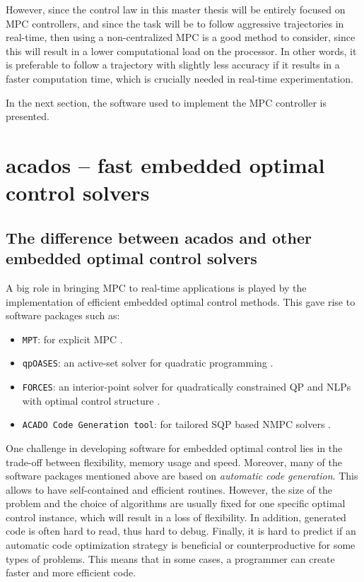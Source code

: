 \documentclass{thesisreport}
\begin{document}
However, since the control law in this master thesis will be entirely focused on MPC controllers, and since the task will be to follow aggressive trajectories in real-time, then using a non-centralized MPC is a good method to consider, since this will result in a lower computational load on the processor. In other words, it is preferable to follow a trajectory with slightly less accuracy if it results in a faster computation time, which is crucially needed in real-time experimentation.

In the next section, the software used to implement the MPC controller is presented.

 \newpage  
	 

 
 \section{acados – fast embedded optimal control solvers}
 
 \subsection{The difference between acados and other embedded optimal control solvers}
 A big role in bringing MPC to real-time applications is played by the implementation of efficient embedded optimal control methods. This gave rise to software
packages such as:
    \begin{itemize}
        \item \texttt{MPT}: for explicit MPC \cite{MPT3}.
        \item \texttt{qpOASES}: an active-set solver for quadratic programming \cite{qpOASES}.
        \item \texttt{FORCES}: an interior-point solver for quadratically constrained QP and NLPs with optimal control structure \cite{FORCES}.
        \item \texttt{ACADO Code Generation tool}: for tailored SQP based NMPC solvers \cite{ACADO}.
    \end{itemize}

One challenge in developing software for embedded optimal control lies in the trade-off between flexibility, memory usage and speed. Moreover, many of the software packages mentioned above are based on \textit{automatic code generation}. This allows to have self-contained and efficient routines. However, the size of the problem and the choice of algorithms are usually fixed for one specific optimal control instance, which will result in a loss of flexibility. In addition, generated code is often hard to read, thus hard to debug. Finally, it is hard to predict if an automatic code optimization strategy is beneficial or counterproductive for some types of problems. This means that in some cases, a programmer can create faster and more efficient code.
\end{document}

